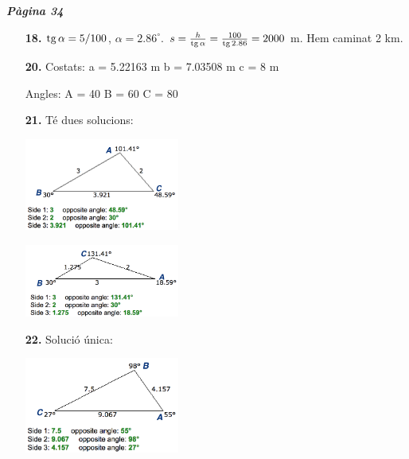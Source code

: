 \documentclass[a4paper, pdf, twoside]{book}
\begin{document}
\begin{multicols}{2}
{\textbf{\em Pàgina 34}} \hrulefill
\begin{enumerate}
\vspace{0.25cm}
\item[\fontfamily{phv}\selectfont\color{blue}\textbf{18. }] 
$\mathrm{tg}\, \alpha = 5/100$, $\alpha = 2.86^\circ $. $s=\frac {h}{\mathrm{tg}\, \alpha } = \frac { 100}{\mathrm{tg}\, 2.86}=2000$ m. Hem caminat 2 km.
 \end{enumerate}
\begin{enumerate}
\vspace{0.25cm}
\item[\fontfamily{phv}\selectfont\color{blue}\textbf{20. }] 
Costats: a = 5.22163 m b = 7.03508 m c = 8 m \par Angles: A = 40 B = 60 C = 80
\vspace{0.25cm}
\item[\fontfamily{phv}\selectfont\color{blue}\textbf{21. }] 
Té dues solucions:\par \includegraphics [width=0.4\textwidth ]{img-sol/t3-21a} \par \includegraphics [width=0.4\textwidth ]{img-sol/t3-21b}
\vspace{0.25cm}
\item[\fontfamily{phv}\selectfont\color{blue}\textbf{22. }] 
Solució única:\par \includegraphics [width=0.4\textwidth ]{img-sol/t3-22}
 \end{enumerate}
\vspace{0.3cm}



\end{multicols}
\end{document}
